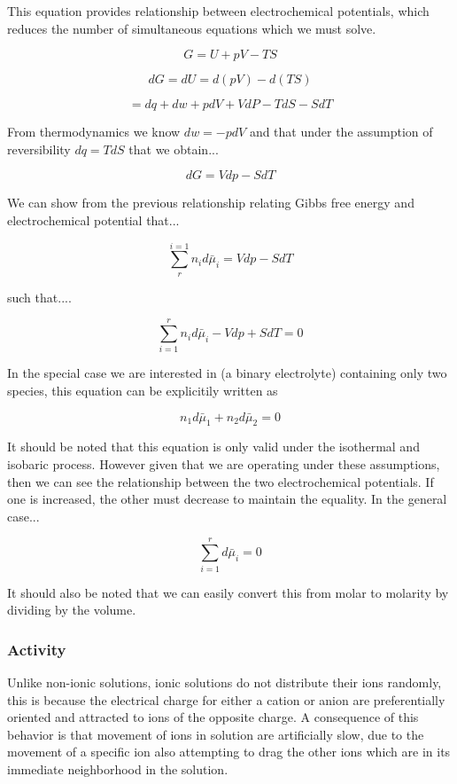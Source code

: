 \documentclass[lettersize,journal]{IEEEtran}
\begin{document}
This equation provides relationship between electrochemical potentials, which reduces the number of simultaneous equations which we must solve.

\[
    G = U + pV - TS
\]

\[
    dG = dU = d(pV) - d(TS)
\]

\[
        = dq + dw + pdV + VdP -TdS - SdT
\]

From thermodynamics we know $dw = -pdV$ and that under the assumption of reversibility $dq = TdS$ that we obtain...

\[
    dG = Vdp - SdT
\]

We can show from the previous relationship relating Gibbs free energy and electrochemical potential that...

\[
    \sum_{r}^{i=1} n_id\bar{\mu}_i = Vdp - SdT
\]

such that....

\[
    \sum_{i=1}^{r} n_id\bar{\mu}_i - Vdp + SdT = 0
\]

In the special case we are interested in (a binary electrolyte) containing only two species, this equation can be explicitily written as

\[
    n_1 d\bar{\mu}_1 + n_2 d\bar{\mu}_2 = 0
\]


It should be noted that this equation is only valid under the isothermal and isobaric process. However given that we are operating under these assumptions, then we can see the relationship between the two electrochemical potentials. If one is increased, the other must decrease to maintain the equality. In the general case...

\[
    \sum_{i=1}^{r}d\bar{\mu}_i = 0
\]

It should also be noted that we can easily convert this from molar to molarity by dividing by the volume.

\subsubsection{Activity}

Unlike non-ionic solutions, ionic solutions do not distribute their ions randomly, this is because the electrical charge for either a cation or anion are preferentially oriented and attracted to ions of the opposite charge. A consequence of this behavior is that movement of ions in solution are artificially slow, due to the movement of a specific ion also attempting to drag the other ions which are in its immediate neighborhood in the solution. \\
\end{document}
